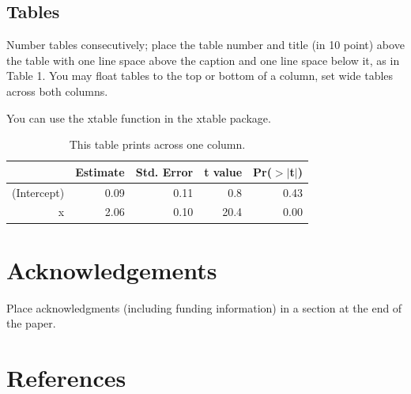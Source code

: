 \documentclass[10pt, letterpaper]{article}
\begin{document}
\hypertarget{tables}{%
\subsection{Tables}\label{tables}}

Number tables consecutively; place the table number and title (in 10
point) above the table with one line space above the caption and one
line space below it, as in Table 1. You may float tables to the top or
bottom of a column, set wide tables across both columns.

You can use the xtable function in the xtable package.

\begin{table}[H]
\centering
\begin{tabular}{rrrrr}
  \hline
 & Estimate & Std. Error & t value & Pr($>$$|$t$|$) \\ 
  \hline
(Intercept) & 0.09 & 0.11 & 0.8 & 0.43 \\ 
  x & 2.06 & 0.10 & 20.4 & 0.00 \\ 
   \hline
\end{tabular}
\caption{This table prints across one column.} 
\end{table}

\hypertarget{acknowledgements}{%
\section{Acknowledgements}\label{acknowledgements}}

Place acknowledgments (including funding information) in a section at
the end of the paper.

\hypertarget{references}{%
\section{References}\label{references}}

\setlength{\parindent}{-0.1in} 
\setlength{\leftskip}{0.125in}

\noindent
\end{document}
